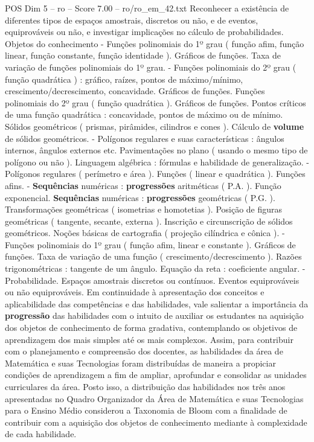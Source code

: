 \begin{textsample}{POS Dim 5 – ro – Score 7.00 – ro/ro\_em\_42.txt}
Reconhecer a existência de diferentes tipos de espaços amostrais, discretos ou não, e de eventos, equiprováveis ou não, e investigar implicações no cálculo de probabilidades.
Objetos do conhecimento - Funções polinomiais do 1º grau ( função afim, função linear, função constante, função identidade ).
Gráficos de funções.
Taxa de variação de funções polinomiais do 1º grau. - Funções polinomiais do 2º grau ( função quadrática ) : gráfico, raízes, pontos de máximo/mínimo, crescimento/decrescimento, concavidade.
Gráficos de funções.
Funções polinomiais do 2º grau ( função quadrática ).
Gráficos de funções.
Pontos críticos de uma função quadrática : concavidade, pontos de máximo ou de mínimo.
Sólidos geométricos ( prismas, pirâmides, cilindros e cones ).
Cálculo de \textbf{volume} de sólidos geométricos. - Polígonos regulares e suas características : ângulos internos, ângulos externos etc.
Pavimentações no plano ( usando o mesmo tipo de polígono ou não ).
Linguagem algébrica : fórmulas e habilidade de generalização. - Polígonos regulares ( perímetro e área ).
Funções ( linear e quadrática ).
Funções afins. - \textbf{Sequências} numéricas : \textbf{progressões} aritméticas ( P.A. ).
Função exponencial. \textbf{Sequências} numéricas : \textbf{progressões} geométricas ( P.G. ).
Transformações geométricas ( isometrias e homotetias ).
Posição de figuras geométricas ( tangente, secante, externa ).
Inscrição e circunscrição de sólidos geométricos.
Noções básicas de cartografia ( projeção cilíndrica e cônica ). - Funções polinomiais do 1º grau ( função afim, linear e constante ).
Gráficos de funções.
Taxa de variação de uma função ( crescimento/decrescimento ).
Razões trigonométricas : tangente de um ângulo.
Equação da reta : coeficiente angular. - Probabilidade.
Espaços amostrais discretos ou contínuos.
Eventos equiprováveis ou não equiprováveis.
Em continuidade à apresentação dos conceitos e aplicabilidade das competências e das habilidades, vale salientar a importância da \textbf{progressão} das habilidades com o intuito de auxiliar os estudantes na aquisição dos objetos de conhecimento de forma gradativa, contemplando os objetivos de aprendizagem dos mais simples até os mais complexos.
Assim, para contribuir com o planejamento e compreensão dos docentes, as habilidades da área de Matemática e suas Tecnologias foram distribuídas de maneira a propiciar condições de aprendizagem a fim de ampliar, aprofundar e consolidar as unidades curriculares da área.
Posto isso, a distribuição das habilidades nos três anos apresentadas no Quadro Organizador da Área de Matemática e suas Tecnologias para o Ensino Médio considerou a Taxonomia de Bloom com a finalidade de contribuir com a aquisição dos objetos de conhecimento mediante à complexidade de cada habilidade.

\end{textsample}
